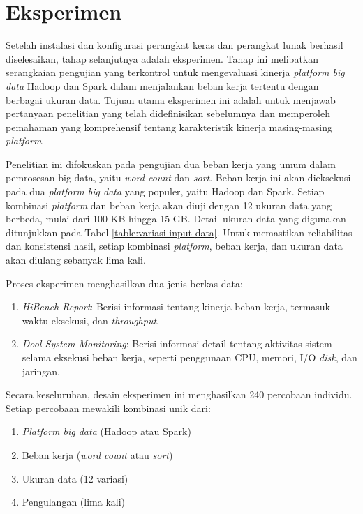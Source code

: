 \section{Eksperimen}
Setelah instalasi dan konfigurasi perangkat keras dan perangkat lunak berhasil diselesaikan, tahap selanjutnya adalah eksperimen. Tahap ini melibatkan serangkaian pengujian yang terkontrol untuk mengevaluasi kinerja \textit{platform big data} Hadoop dan Spark dalam menjalankan beban kerja tertentu dengan berbagai ukuran data. Tujuan utama eksperimen ini adalah untuk menjawab pertanyaan penelitian yang telah didefinisikan sebelumnya dan memperoleh pemahaman yang komprehensif tentang karakteristik kinerja masing-masing \textit{platform}.

Penelitian ini difokuskan pada pengujian dua beban kerja yang umum dalam pemrosesan big data, yaitu \textit{word count} dan \textit{sort}. Beban kerja ini akan dieksekusi pada dua \textit{platform big data} yang populer, yaitu Hadoop dan Spark. Setiap kombinasi \textit{platform} dan beban kerja akan diuji dengan 12 ukuran data yang berbeda, mulai dari 100 KB hingga 15 GB. Detail ukuran data yang digunakan ditunjukkan pada Tabel \ref{table:variasi-input-data}. Untuk memastikan reliabilitas dan konsistensi hasil, setiap kombinasi \textit{platform}, beban kerja, dan ukuran data akan diulang sebanyak lima kali. 

Proses eksperimen menghasilkan dua jenis berkas data: 
\begin{enumerate}
	\item \textit{HiBench Report}: Berisi informasi tentang kinerja beban kerja, termasuk waktu eksekusi, dan \textit{throughput}.
	\item \textit{Dool System Monitoring}: Berisi informasi detail tentang aktivitas sistem selama eksekusi beban kerja, seperti penggunaan CPU, memori, I/O \textit{disk}, dan jaringan.
\end{enumerate}

Secara keseluruhan, desain eksperimen ini menghasilkan 240 percobaan individu. Setiap percobaan mewakili kombinasi unik dari:
\begin{enumerate}
	\item \textit{Platform big data} (Hadoop atau Spark)
	\item Beban kerja (\textit{word count} atau \textit{sort})
	\item Ukuran data (12 variasi)
	\item Pengulangan (lima kali)
\end{enumerate}

